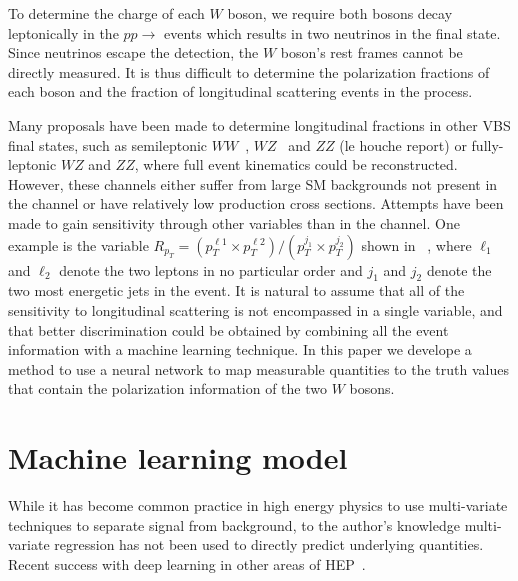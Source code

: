 To determine the charge of each $W$ boson, we require both bosons decay leptonically in the $pp \rightarrow$ \ssWW 
events which results in two neutrinos in the final state. Since neutrinos escape the detection, the $W$ boson's rest frames cannot be directly measured. 
It is thus difficult to determine the polarization fractions of each boson and the fraction of longitudinal scattering events in the \ssWW process.

Many proposals have been made to determine longitudinal fractions in other VBS final states, such as semileptonic $WW$~\cite{Han:2009em}, $WZ$~\cite{aa} and $ZZ$ 
(le houche report) or fully-leptonic $WZ$ and $ZZ$, where full event kinematics could be reconstructed. However, these channels either suffer from large SM backgrounds 
not present in the \ssWW channel or have relatively low production cross sections. Attempts have been made to gain sensitivity through other variables than \ts in the \ssWW 
channel. One example is the variable $R_{p_T}=(p_{T}^{\ell 1} \times p_{T}^{\ell 2}) / (p_T^{j_1} \times p_T^{j_2})$ shown in ~\cite{Doroba:2012pd}, where $\ell_1$ 
and $\ell_2$ denote the two leptons in no particular order and $j_1$ and $j_2$ denote the two most energetic jets in the event. 
It is natural to assume that all of the sensitivity to longitudinal scattering is not encompassed in a single variable, and that better discrimination could be obtained by 
combining all the event information with a machine learning technique. In this paper we develope a method to use a neural network to map measurable quantities to 
the truth \cts values that contain the polarization information of the two $W$ bosons. 

\section{Machine learning model}
While it has become common practice in high energy physics to use multi-variate techniques to separate signal 
from background, to the author's knowledge multi-variate regression has not been used to directly predict underlying quantities. 
Recent success with deep learning in other areas of HEP~\cite{Baldi:2014pta,Baldi:2014pta}. 

